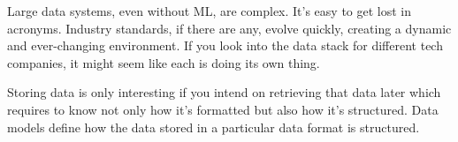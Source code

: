 
















\newpage
Large data systems, even without ML, are complex. It's easy to get
lost in acronyms.  Industry standards, if there are any, evolve
quickly, creating a dynamic and ever-changing environment. If you
look into the data stack for different tech companies, it might seem
like each is doing its own thing.

Storing data is only interesting if you intend on retrieving that
data later which requires to know not only how it's formatted but
also how it's structured. Data models define how the data stored in
a particular data format is structured.

